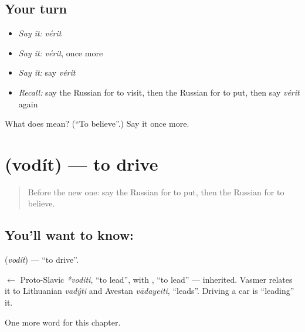 \subsection*{Your turn}
\begin{itemize}
\raggedright
  \item \emph{Say it:} \emph{vérit}
  \item \emph{Say it:} \emph{vérit}, once more
  \item \emph{Say it:} say \emph{vérit}
  \item \emph{Recall:} say the Russian for to visit, then the Russian for to put, then say \emph{vérit} again
\end{itemize}

\begin{tcolorbox}[breakable,colback=teal!4,colframe=teal!35!black,title={Before you move on}]
What does  mean? (\textquotedblleft{}To believe\textquotedblright{}.) Say it once more.
\end{tcolorbox}
\section[\texorpdfstring{\ru{водить} (vodít)}{водить (vodít)}]{ (vodít) — to drive}

\label{lesson:RU-C131-to-drive}



\begin{quote}
Before the new one: say the Russian for to put, then the Russian for to believe.
\end{quote}

\subsection*{You'll want to know: }
\textbf{} (\emph{vodít}) — \textquotedblleft{}to drive\textquotedblright{}.

\begin{cousinweb}
\textbf{} $\leftarrow$ Proto-Slavic \emph{*voditi}, \textquotedblleft{}to lead\textquotedblright{}, with \emph{}, \textquotedblleft{}to lead\textquotedblright{} — inherited. Vasmer relates it to Lithuanian \emph{vadýti} and Avestan \emph{vādayeiti}, \textquotedblleft{}leads\textquotedblright{}. Driving a car is \textquotedblleft{}leading\textquotedblright{} it.
\end{cousinweb}

\begin{grammarlens}[title={What you've built}]
One more word for this chapter.
\end{grammarlens}


